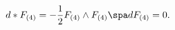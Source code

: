 \begin{equation}
\label{fseqs}
d * F_{(4)} = - \frac{1}{2} F_{(4)} \wedge F_{(4)}
\spa
d F_{(4)} = 0.
\end{equation}

